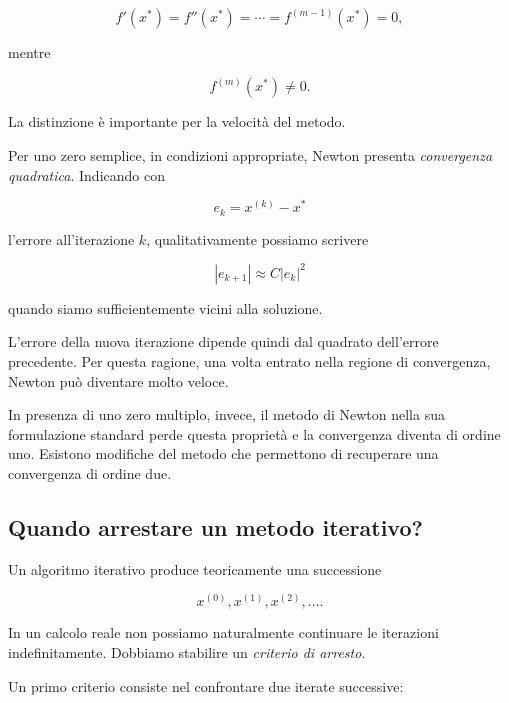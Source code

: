 \begin{equation*}
    f'(x^*)=
    f''(x^*)=
    \cdots=
    f^{(m-1)}(x^*)=0,
\end{equation*}

mentre

\begin{equation*}
    f^{(m)}(x^*)\neq0.
\end{equation*}

La distinzione è importante per la velocità del metodo.

Per uno zero semplice, in condizioni appropriate, Newton presenta
\emph{convergenza quadratica}. Indicando con

\begin{equation*}
    e_k=x^{(k)}-x^*
\end{equation*}

l'errore all'iterazione $k$, qualitativamente possiamo scrivere

\begin{equation*}
    |e_{k+1}|
    \approx
    C|e_k|^2
\end{equation*}

quando siamo sufficientemente vicini alla soluzione.

L'errore della nuova iterazione dipende quindi dal quadrato
dell'errore precedente. Per questa ragione, una volta entrato nella
regione di convergenza, Newton può diventare molto veloce.

In presenza di uno zero multiplo, invece, il metodo di Newton nella
sua formulazione standard perde questa proprietà e la convergenza
diventa di ordine uno. Esistono modifiche del metodo che permettono
di recuperare una convergenza di ordine due. 


\subsection{Quando arrestare un metodo iterativo?}

Un algoritmo iterativo produce teoricamente una successione

\begin{equation*}
    x^{(0)},x^{(1)},x^{(2)},\ldots.
\end{equation*}

In un calcolo reale non possiamo naturalmente continuare le
iterazioni indefinitamente. Dobbiamo stabilire un
\emph{criterio di arresto}.

Un primo criterio consiste nel confrontare due iterate successive:

